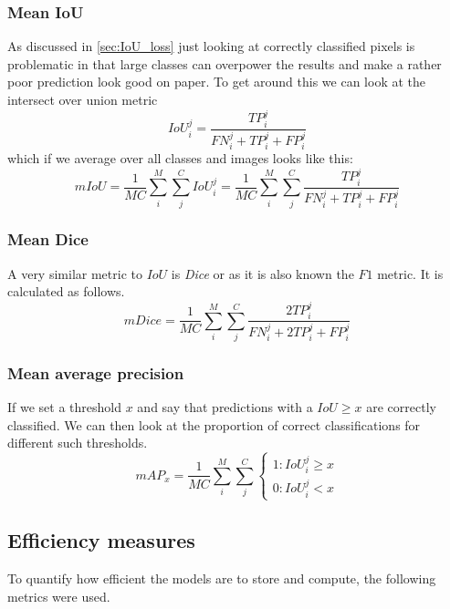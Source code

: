 \documentclass{kththesis}
\begin{document}
\subsubsection{Mean IoU}
As discussed in \cref{sec:IoU_loss} just looking at correctly classified pixels
is problematic in that large classes can overpower the results and make a rather
poor prediction look good on paper. To get around this we can look at the
intersect over union metric
\[IoU^j_i= \frac{\textit{TP}_i^j}{\textit{FN}_i^j + \textit{TP}_i^j + \textit{FP}_i^j}\]
which if we average over all classes and images looks like this:
\[\textit{m}IoU = \frac{1}{MC}\sum^M_i\sum^C_j IoU^j_i =\frac{1}{MC}\sum^M_i\sum^C_j\frac{\textit{TP}_i^j}{\textit{FN}_i^j +
    \textit{TP}_i^j + \textit{FP}_i^j}\]

\subsubsection{Mean Dice}
A very similar metric to \(IoU\) is \textit{Dice} or as it is also known the
\(F1\) metric. It is calculated as follows.
\[\textit{mDice} = \frac{1}{MC}\sum^M_i\sum^C_j\frac{2\textit{TP}_i^j}{\textit{FN}_i^j +
    2\textit{TP}_i^j + \textit{FP}_i^j}\]

\subsubsection{Mean average precision}
If we set a threshold \(x\) and say that predictions with a \(IoU \geq x\) are
correctly classified. We can then look at the proportion of correct
classifications for different such thresholds.
\[
  mAP_x = \frac{1}{MC}\sum^M_i\sum^C_j
    \begin{cases}
      1: IoU_i^j \geq x\\
      0: IoU_ i^j < x
   \end{cases}
\]


\subsection{Efficiency measures}
To quantify how efficient the models are to store and compute, the following
metrics were used.
\end{document}

